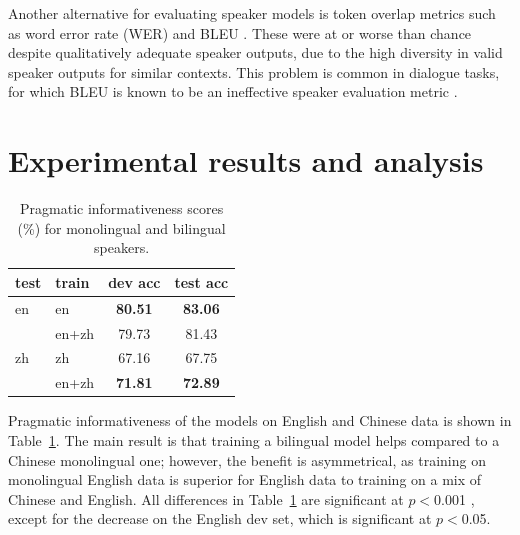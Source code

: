 \documentclass[11pt,a4paper]{article}
\renewcommand{\|}{\mid}
\newcommand{\tabref}[1]{Table~\ref{#1}}
\begin{document}
Another alternative for evaluating speaker models is token overlap metrics such as word error
rate (WER) and BLEU \cite{Papineni2002}. These were at or worse than
chance despite qualitatively adequate speaker outputs, due to the high diversity in valid speaker outputs
for similar contexts. This problem is common in dialogue tasks,
for which BLEU is known to be an ineffective speaker evaluation metric \cite{Liu2016}.

\section{Experimental results and analysis}

\begin{table}[t]
\centering
\begin{tabular}{llcc}
\toprule
test & train & dev acc & test acc \\
\midrule
en     & en    & \textbf{80.51} & \textbf{83.06} \\
       & en+zh & 79.73          & 81.43 \\ %
\midrule
zh     & zh    & 67.16          & 67.75 \\
       & en+zh & \textbf{71.81} & \textbf{72.89} \\ %
\bottomrule
\end{tabular}
\caption{Pragmatic informativeness scores (\%) for monolingual and bilingual speakers.}
\label{tab:accuracy}
\end{table}

Pragmatic informativeness of the models on English and Chinese data is shown in \tabref{tab:accuracy}. The main result is that training a
bilingual model helps compared to a Chinese monolingual one; however, the benefit is asymmetrical, as training on monolingual English data is superior for English data to training on a mix of
Chinese and English. All differences in \tabref{tab:accuracy} are significant at $p < {}$0.001 \citep[approximate permutation test, 10,000 samples;][]{Pado2006}, except for the
decrease on the English dev set, which is significant at $p < {}$0.05.
\end{document}
